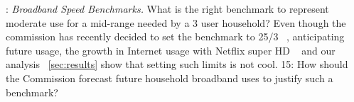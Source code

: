 : \emph{Broadband Speed Benchmarks.}  What is the right benchmark to represent moderate use for a mid-range needed by a 3 user household? Even though the commission has recently decided to set the benchmark to 25/3 ~\cite{}, anticipating future usage, the growth in Internet usage with Netflix super HD ~\cite{} and our analysis ~\ref{sec:results} show that setting such limits is not cool. 15: How should the Commission forecast future household broadband uses to justify such a benchmark?

